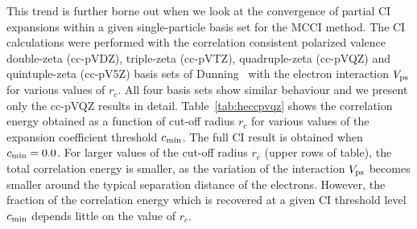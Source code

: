 This trend is further borne out when we look at the convergence 
of partial CI expansions within a given single-particle basis set 
for the MCCI method.  
The CI calculations were performed with the correlation consistent 
polarized valence double-zeta (cc-pVDZ), triple-zeta (cc-pVTZ), quadruple-zeta (cc-pVQZ)
and quintuple-zeta (cc-pV5Z) basis sets of Dunning~\cite{Dunn} with 
the electron interaction $V_{\rm ps}$ for various values of $r_c$. 
All four basis sets show similar behaviour and we present only 
the cc-pVQZ results in detail.
Table~\ref{tab:heccpvqz} shows the correlation energy obtained 
as a function of cut-off radius $r_c$ for various values of the 
expansion coefficient threshold $c_{\rm min}$.
The full CI result is obtained when $c_{\rm min}=0.0$.
For larger values of the cut-off radius $r_c$ (upper rows of table),
the total correlation energy is smaller, as the variation of the 
interaction $V_{\rm ps}$ becomes smaller around the typical separation 
distance of the electrons. 
However, the fraction of the correlation energy which is recovered 
at a given CI threshold level $c_{\rm min}$ depends little on the value 
of $r_c$. 


%
%

